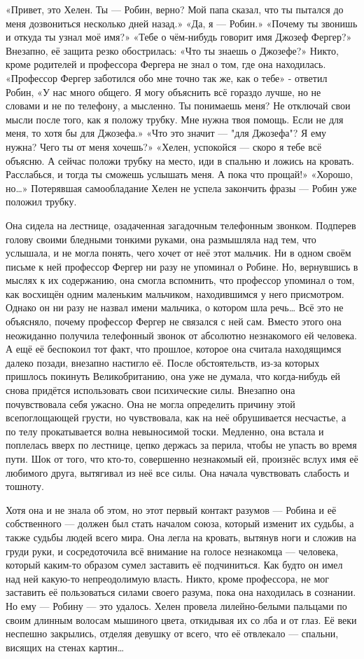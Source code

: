 \documentclass[a4paper,12pt]{book}
\begin{document}
	«Привет, это Хелен. Ты — Робин, верно? Мой папа сказал, что ты пытался до меня дозвониться несколько дней назад.»
	«Да, я — Робин.»
	«Почему ты звонишь и откуда ты узнал моё имя?»
	«Тебе о чём-нибудь говорит имя Джозеф Фергер?»
	Внезапно, её защита резко обострилась:
	«Что ты знаешь о Джозефе?»
	Никто, кроме родителей и профессора Фергера не знал о том, где она находилась.
	«Профессор Фергер заботился обо мне точно так же, как о тебе» - ответил Робин,
	«У нас много общего. Я могу объяснить всё гораздо лучше, но не словами и не по телефону, а мысленно. Ты понимаешь меня? Не отключай свои мысли после того, как я положу трубку. Мне нужна твоя помощь. Если не для меня, то хотя бы для Джозефа.»
	«Что это значит — "для Джозефа"? Я ему нужна? Чего ты от меня хочешь?»
	«Хелен, успокойся — скоро я тебе всё объясню. А сейчас положи трубку на место, иди в спальню и ложись на кровать. Расслабься, и тогда ты сможешь услышать меня. А пока что прощай!»
	«Хорошо, но…»
	Потерявшая самообладание Хелен не успела закончить фразы — Робин уже положил трубку.

	Она сидела на лестнице, озадаченная загадочным телефонным звонком. Подперев голову своими бледными тонкими руками, она размышляла над тем, что услышала, и не могла понять, чего хочет от неё этот мальчик. Ни в одном своём письме к ней профессор Фергер ни разу не упоминал о Робине. Но, вернувшись в мыслях к их содержанию, она смогла вспомнить, что профессор упоминал о том, как восхищён одним маленьким мальчиком, находившимся у него присмотром. Однако он ни разу не назвал имени мальчика, о котором шла речь…
	Всё это не объясняло, почему профессор Фергер не связался с ней сам. Вместо этого она неожиданно получила телефонный звонок от абсолютно незнакомого ей человека.
	А ещё её беспокоил тот факт, что прошлое, которое она считала находящимся далеко позади, внезапно настигло её.
	После обстоятельств, из-за которых пришлось покинуть Великобританию, она уже не думала, что когда-нибудь ей снова придётся использовать свои психические силы.
	Внезапно она почувствовала себя ужасно. Она не могла определить причину этой всепоглощающей грусти, но чувствовала, как на неё обрушивается несчастье, а по телу прокатывается волна невыносимой тоски.
	Медленно, она встала и поплелась вверх по лестнице, цепко держась за перила, чтобы не упасть во время пути. Шок от того, что кто-то, совершенно незнакомый ей, произнёс вслух имя её любимого друга, вытягивал из неё все силы. Она начала чувствовать слабость и тошноту.

	Хотя она и не знала об этом, но этот первый контакт разумов — Робина и её собственного — должен был стать началом союза, который изменит их судьбы, а также судьбы людей всего мира.
	Она легла на кровать, вытянув ноги и сложив на груди руки, и сосредоточила всё внимание на голосе незнакомца — человека, который каким-то образом сумел заставить её подчиниться. Как будто он имел над ней какую-то непреодолимую власть. Никто, кроме профессора, не мог заставить её пользоваться силами своего разума, пока она находилась в сознании. Но ему — Робину — это удалось.
	Хелен провела лилейно-белыми пальцами по своим длинным волосам мышиного цвета, откидывая их со лба и от глаз. Её веки неспешно закрылись, отделяя девушку от всего, что её отвлекало — спальни, висящих на стенах картин…
\end{document}
